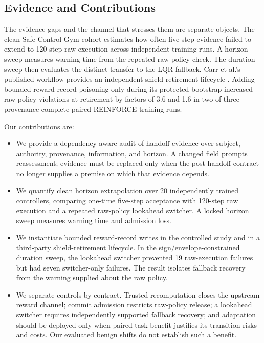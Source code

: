 \subsection{Evidence and Contributions}

The evidence gaps and the channel that stresses them are separate objects.  The
clean Safe-Control-Gym cohort estimates how often five-step evidence failed to
extend to 120-step raw execution across independent training runs.  A horizon
sweep measures warning time from the repeated raw-policy check.  The duration
sweep then evaluates the distinct transfer to the LQR fallback.  Carr et al.'s
published workflow provides an independent shield-retirement lifecycle
\cite{carr_partial_shielding_2023}.  Adding bounded reward-record poisoning only
during its protected bootstrap increased raw-policy violations at retirement
by factors of 3.6 and 1.6 in two of three provenance-complete paired REINFORCE
training runs.

Our contributions are:

\begin{itemize}
    \item We provide a dependency-aware audit of handoff evidence over subject,
    authority, provenance, information, and horizon.  A changed field prompts
    reassessment; evidence must be replaced only when the post-handoff contract
    no longer supplies a premise on which that evidence depends.
    \item We quantify clean horizon extrapolation over 20 independently trained
    controllers, comparing one-time five-step acceptance with 120-step raw
    execution and a repeated raw-policy lookahead switcher.  A locked horizon
    sweep measures warning time and admission loss.
    \item We instantiate bounded reward-record writes in the controlled study
    and in a third-party shield-retirement lifecycle.  In the
    sign/envelope-constrained duration sweep, the lookahead switcher prevented
    19 raw-execution failures but had seven switcher-only failures.  The result
    isolates fallback recovery from the warning supplied about the raw policy.
    \item We separate controls by contract.  Trusted recomputation closes the
    upstream reward channel; commit admission restricts raw-policy release;
    a lookahead switcher requires independently supported fallback recovery;
    and adaptation should be deployed only when paired task benefit justifies
    its transition risks and costs.  Our evaluated benign shifts do not
    establish such a benefit.
\end{itemize}
